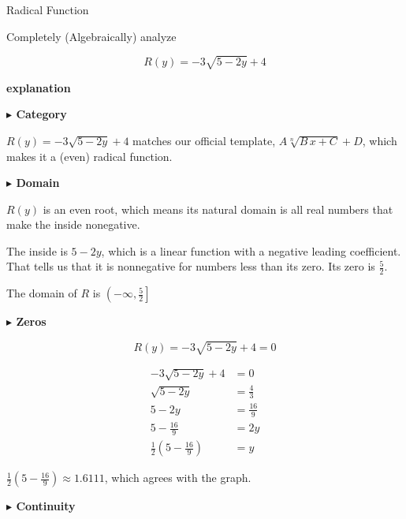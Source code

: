 \documentclass{ximera}
\begin{document}
\begin{example} Radical Function

Completely (Algebraically) analyze

\[
R(y) = -3 \sqrt{5-2y} + 4
\]




\textbf{\textcolor{red!75!green}{explanation}} 




\textbf{\textcolor{blue!55!black}{$\blacktriangleright$ Category}} 



$R(y) = -3 \sqrt{5-2y} + 4$ matches our official template, $A \sqrt[n]{B \, x + C} + D $, which makes it a (even) radical function.  





\textbf{\textcolor{blue!55!black}{$\blacktriangleright$ Domain}} 


$R(y)$ is an even root, which means its natural domain is all real numbers that make the inside nonegative.

The inside is $5-2y$, which is a linear function with a negative leading coefficient.  That tells us that it is nonnegative for numbers less than its zero.  Its zero is $\frac{5}{2}$.

The domain of $R$ is $\left( -\infty, \frac{5}{2} \right]$






\textbf{\textcolor{blue!55!black}{$\blacktriangleright$ Zeros}} 

\[
R(y) = -3 \sqrt{5-2y} + 4 = 0
\]

\begin{align*}
-3 \sqrt{5-2y} + 4 &= 0 \\
\sqrt{5-2y} &= \frac{4}{3} \\
5 - 2y &= \frac{16}{9} \\
5 - \frac{16}{9} &= 2y  \\
\frac{1}{2} \left( 5 - \frac{16}{9} \right) &= y  
\end{align*}


$\frac{1}{2} \left( 5 - \frac{16}{9} \right) \approx 1.6111$, which agrees with the graph. 














\textbf{\textcolor{blue!55!black}{$\blacktriangleright$ Continuity}} 


\end{example}
\end{document}
